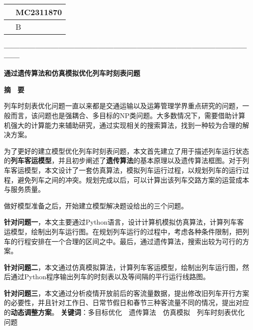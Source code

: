 \thispagestyle{empty}   %

\begin{table}[h]
    \centering
    \renewcommand\arraystretch{2}
    \begin{tabular}{|l|l|}
    \hline
    \quad & MC2311870\quad \\ \hline
       & B         \\ \hline
    \end{tabular}
\end{table}



\begin{center}
    \textbf{—————————————————————————————————}

    \textbf{\fontsize{20}{1.5}通过遗传算法和仿真模拟优化列车时刻表问题}

    \textbf{摘　要}
\end{center}





%
%

列车时刻表优化问题一直以来都是交通运输以及运筹管理学界重点研究的问题，一般而言，该问题也是强耦合、多目标的NP类问题。大多数情况下，需要借助计算机强大的计算能力来辅助研究，通过实现相关的搜索算法，找到一种较为合理的解决方案\cite{niuGuidaoliecheshikebiaowentiyanjiuzongshu2021}。

为了更好的建立模型优化列车时刻表问题，本文首先建立了用于描述列车运行状态的\textbf{列车客运模型}，并且初步阐述了\textbf{遗传算法}的基本原理以及遗传算法框图。对于列车客运模型，本文设计了一套仿真算法，模拟列车运行过程，以规划列车的运行过程，避免列车之间的冲突。规划完成以后，可以计算出该列车交路方案的运营成本与服务质量。

做好模型准备之后，开始建立模型解决题设给出的三个问题。

\textbf{针对问题一}，本文主要通过Python语言，设计计算机模拟仿真算法，计算列车客运模型，绘制出列车运行图。在规划列车运行的过程中，考虑各种条件限制，把列车的行程安排在一个合理的区间之中。最后，通过遗传算法，搜索出较为可行的方案。

\textbf{针对问题二}，本文通过仿真模拟算法，计算列车客运模型，绘制出列车运行图，然后通过Python程序输出列车的时刻表以及等间隔的平行运行线路图。


\textbf{针对问题三}，本文通过分析疫情开放前后的客流量数据，提出修改旧列车开行方案的必要性，并且针对工作日、日常节假日和春节三种客流量不同的情况，提出对应的\textbf{动态调整方案}。\newline
\newline
\newline
\textbf{关键词}：多目标优化　遗传算法　仿真模拟　列车时刻表优化问题




%
%

\newpage
\tableofcontents
\thispagestyle{empty}